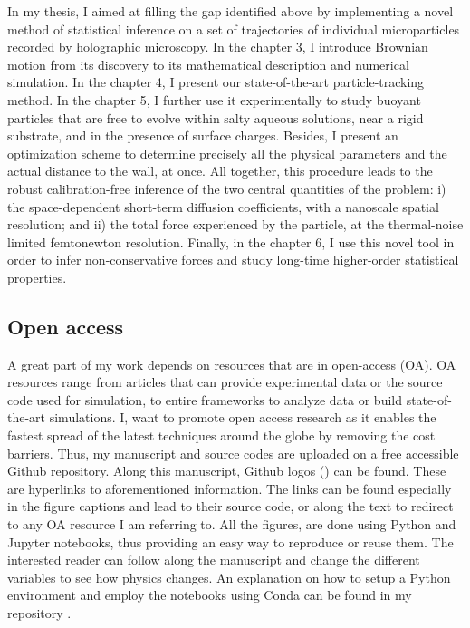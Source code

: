 In my thesis, I aimed at filling the gap identified above by implementing a novel method of statistical inference on a set of trajectories of individual microparticles recorded by holographic microscopy. In the chapter 3, I introduce Brownian motion from its discovery to its mathematical description and numerical simulation. In the chapter 4, I present our state-of-the-art particle-tracking method. In the chapter 5, I further use it experimentally to study  buoyant particles that are free to evolve within salty aqueous solutions, near a rigid substrate, and in the presence of surface charges. Besides, I present an optimization scheme to determine precisely all the physical parameters and the actual distance to the wall, at once. All together, this procedure leads to the robust calibration-free inference of the two central quantities of the problem: i) the space-dependent short-term diffusion coefficients, with a nanoscale spatial resolution; and ii) the total force experienced by the particle, at the thermal-noise limited femtonewton resolution. Finally, in the chapter 6, I use this novel tool in order to infer non-conservative forces and study long-time higher-order statistical properties.



\subsection*{Open access}

A great part of my work depends on resources that are in open-access (OA). OA resources range from articles that can provide experimental data or the source code used for simulation, to entire frameworks to analyze data or build state-of-the-art simulations. I, want to promote open access research as it enables the fastest spread of the latest techniques around the globe by removing the cost barriers. Thus, my manuscript and source codes are uploaded on a free accessible Github repository. Along this manuscript, Github logos (\href{https://github.com/eXpensia/Ma-these/}{\faGithub}) can be found. These are hyperlinks to aforementioned information. The links can be found especially in the figure captions and lead to their source code, or along the text to redirect to any OA resource I am referring to. All the figures, are done using Python and Jupyter notebooks, thus providing an easy way to reproduce or reuse them. The interested reader can follow along the manuscript and change the different variables to see how physics changes.  An explanation on how to setup a Python environment and employ the notebooks using Conda can be found in my repository \href{https://github.com/eXpensia/Ma-these/}{\faGithub}.



